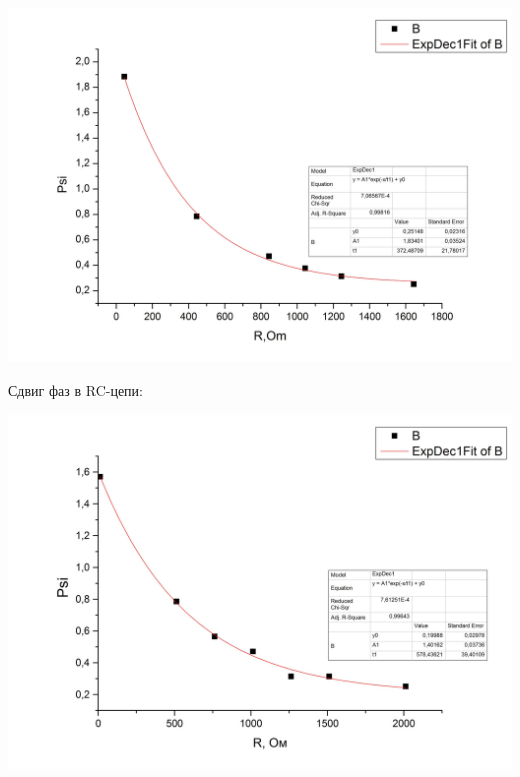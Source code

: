 \documentclass[a4paper,12pt]{article}
\begin{document}
		\includegraphics[width = 0.9\linewidth]{graph3}
		
	Сдвиг фаз в RC-цепи:
	
		\includegraphics[width = 0.9\linewidth]{graph1}
		
	\pagebreak
\end{document}
